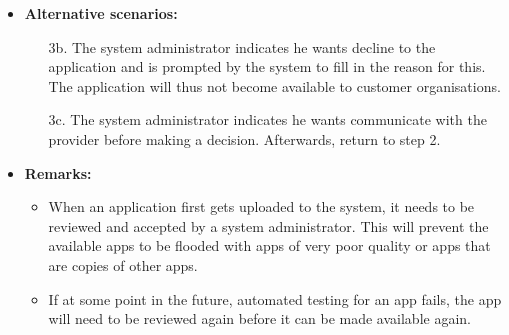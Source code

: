 \begin{itemize}
    \item \textbf{Alternative scenarios:}
        \begin{enumerate}
            \item [3b.] The system administrator indicates he wants decline to the application
                  and is prompted by the system to fill in the reason for this. The
                  application will thus not become available to customer organisations.
            \item [3c.] The system administrator indicates he wants communicate
                  with the provider before making a decision. Afterwards, return to
                  step 2.
        \end{enumerate}

    \item \textbf{Remarks:}
        \begin{itemize}
            \item When an application first gets uploaded to the system, it needs to be
                  reviewed and accepted by a system administrator. This will prevent
                  the available apps to be flooded with apps of very poor quality
                  or apps that are copies of other apps.
            \item If at some point in the future, automated testing for an app fails,
                  the app will need to be reviewed again before it can be made
                  available again.
        \end{itemize}
\end{itemize}
